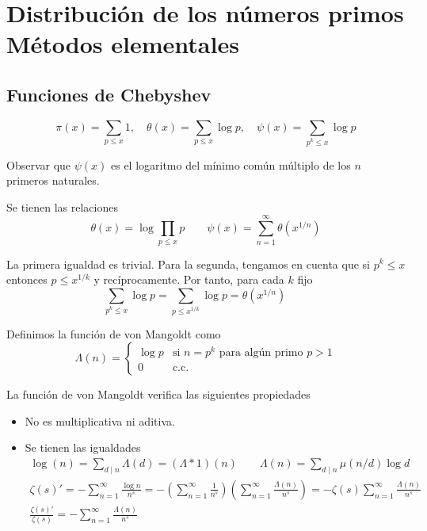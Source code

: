 \documentclass[TAN.tex]{subfiles}
\begin{document}
\chapter{Distribución de los números primos\\Métodos elementales}

\section{Funciones de Chebyshev}
\begin{nota}
\[ π(x)=\sum_{p≤x} 1, \quad θ(x) = \sum_{p≤x} \log p, \quad ψ(x)=\sum_{p^k≤x} \log p \]
\end{nota}
Observar que $ψ(x)$ es el logaritmo del mínimo común múltiplo de los $n$ primeros naturales.

\begin{prop} Se tienen las relaciones
$$
\theta(x)=\log \prod_{p\leq x} p \qquad\psi(x)=\sum_{n=1}^\infty \theta(x^{1/n})$$
\end{prop}
\begin{dem}
La primera igualdad es trivial. Para la segunda, tengamos en cuenta que si $p^k \leq x$ entonces $p\leq x^{1/k}$ y recíprocamente. Por tanto, para cada $k$ fijo
$$
\sum_{p^k≤x} \log p = \sum_{p≤x^{1/k}} \log p = \theta(x^{1/n}) \qquad 
 $$
\end{dem}
\begin{defi}
Definimos la función de von Mangoldt como
$$
\Lambda(n)=
\begin{cases}
\log p & \text{si $n=p^k$ para algún primo $p>1$}\\
0 & \text{c.c.}
\end{cases}
$$
\end{defi}
\begin{prop}
La función de von Mangoldt verifica las siguientes propiedades
\begin{itemize}
\item No es multiplicativa ni aditiva.
\item Se tienen las igualdades
\begin{gather*}
\log(n) = \sum_{d\mid n} \Lambda(d) = (\Lambda \ast 1)(n) \qquad \Lambda(n) = \sum_{d\mid n} \mu(n/d)\log d \\
\zeta(s)' = - \sum_{n=1}^\infty \frac{\log n}{n^s} = -\left(\sum_{n=1}^\infty \frac{1}{n^s} \right)\left(\sum_{n=1}^\infty \frac{\Lambda(n)}{n^s} \right) = - \zeta(s)\sum_{n=1}^\infty \frac{\Lambda(n)}{n^s} \\
\frac{\zeta(s)'}{\zeta(s)}= -\sum_{n=1}^\infty \frac{\Lambda(n)}{n^s}
\end{gather*}
\end{itemize}
\end{prop}
\end{document}
